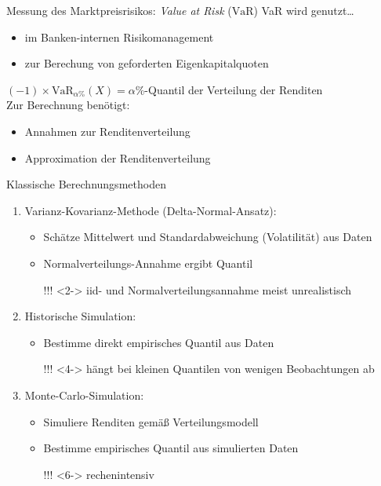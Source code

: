 \documentclass{beamer}
\def\VaR{\text{VaR}}
\begin{document}
\begin{frame}{Messung des Marktpreisrisikos: \emph{Value at Risk} ($\VaR$)}
VaR wird genutzt\ldots
\begin{itemize}
\item im Banken-internen Risikomanagement
\item zur Berechung von geforderten Eigenkapitalquoten %
\end{itemize}
\pause
\bigskip
$(-1) \times \VaR_{\alpha\%}(X) = \alpha\%$-Quantil der Verteilung der Renditen\\[2ex]
\pause
Zur Berechnung benötigt:
\begin{itemize}
\item Annahmen zur Renditenverteilung
\item Approximation der Renditenverteilung
\end{itemize}
\end{frame}

\begin{frame}{Klassische Berechnungsmethoden}
\begin{enumerate}
\item<1-> Varianz-Kovarianz-Methode (Delta-Normal-Ansatz):
 \begin{itemize}
 \item<1-> Schätze Mittelwert und Standardabweichung (Volatilität) aus Daten
 \item<1-> Normalverteilungs-Annahme ergibt Quantil
 \item[\alert{!!!}]<2-> iid- und Normalverteilungsannahme meist unrealistisch \\[2ex]
 \end{itemize}
\item<3-> Historische Simulation:
 \begin{itemize}
 \item<3-> Bestimme direkt empirisches Quantil aus Daten
 \item[\alert{!!!}]<4-> hängt bei kleinen Quantilen von wenigen Beobachtungen ab \\[2ex] 
 \end{itemize}
\item<5-> Monte-Carlo-Simulation:
 \begin{itemize}
 \item<5-> Simuliere Renditen gemäß Verteilungsmodell
 \item<5-> Bestimme empirisches Quantil aus simulierten Daten
 \item[\alert{!!!}]<6-> rechenintensiv
 \end{itemize}
\end{enumerate}
\end{frame}
\end{document}
